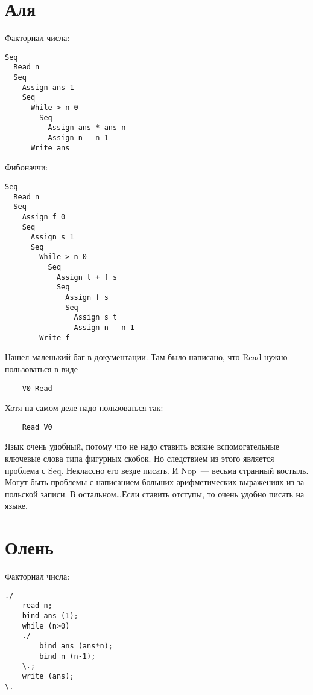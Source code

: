 \documentclass[10pt]{article}
\begin{document}
\section{Аля}

Факториал числа:

\begin{verbatim}
Seq
  Read n
  Seq
    Assign ans 1
    Seq
      While > n 0
        Seq
          Assign ans * ans n
          Assign n - n 1
      Write ans
\end{verbatim}

Фибоначчи:

\begin{verbatim}
Seq
  Read n
  Seq
    Assign f 0
    Seq
      Assign s 1
      Seq
        While > n 0
          Seq
            Assign t + f s
            Seq
              Assign f s
              Seq
                Assign s t
                Assign n - n 1
        Write f
\end{verbatim}


Нашел маленький баг в документации. Там было написано, что Read нужно пользоваться в виде

\begin{verbatim}
    V0 Read
\end{verbatim}

Хотя на самом деле надо пользоваться так:

\begin{verbatim}
    Read V0
\end{verbatim}

Язык очень удобный, потому что не надо ставить всякие вспомогательные ключевые слова типа фигурных скобок.
Но следствием из этого является проблема с Seq. Неклассно его везде писать. И Nop~--- весьма странный костыль.
Могут быть проблемы с написанием больших арифметических выражениях из-за польской записи.
В остальном\ldots Если ставить отступы, то очень удобно писать на языке.





\section{Олень}

Факториал числа:

\begin{verbatim}
./
    read n;
    bind ans (1);
    while (n>0)
    ./
        bind ans (ans*n);
        bind n (n-1);
    \.;
    write (ans);
\.
\end{verbatim}
\end{document}
